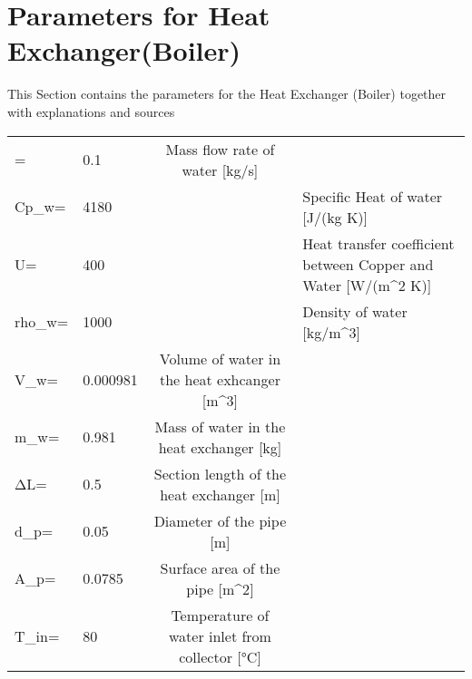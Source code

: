 
	

\section{Parameters for Heat Exchanger(Boiler)} 

This Section contains the parameters for the Heat Exchanger (Boiler) together with explanations and sources 

\begin{tabular}{ l l |c| l} 
	\dot{m_{w}}=		&0.1		&Mass flow rate of water [kg/s]\\     	
	Cp_{w}=		&4180	&\cite{Specific Heat}	&Specific Heat of water [J/(kg K)]\\     
	U=		&400	&\cite{Heat Transfer coefficientl}	&Heat transfer coefficient between Copper and Water [W/(m^{2} K)] \\
	rho_{w}=		&1000	&\cite{Water density}	&Density of water [kg/m^{3}] \\
	V_{w}=		&0.000981		&Volume of water in the heat exhcanger [m^{3}]  \\
	m_{w}=		&0.981		&Mass of water in the heat exchanger [kg]  \\
	ΔL=		&0.5		&Section length of the heat exchanger [m]  \\
	d_{p}=		&0.05		&Diameter of the pipe [m]  \\
	A_{p}=		&0.0785		&Surface area of the pipe [m^{2}]  \\
	T_{in}=		&80	        &Temperature of water inlet from collector [°C]  \\
	
	
\end{tabular}




